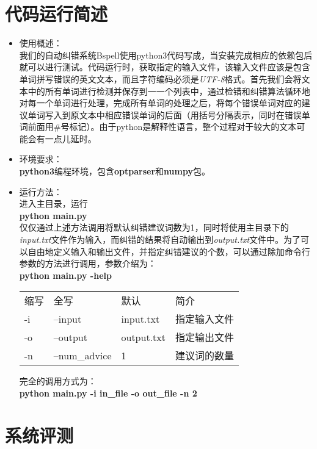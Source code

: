 \documentclass[UTF8,a4paper]{ctexart}
\begin{document}
\section{代码运行简述}

\begin{itemize}
    \item 使用概述： \\
    我们的自动纠错系统Bspell使用python3代码写成，当安装完成相应的依赖包后就可以进行测试。代码运行时，获取指定的输入文件，该输入文件应该是包含单词拼写错误的英文文本，而且字符编码必须是\textit{UTF-8}格式。首先我们会将文本中的所有单词进行检测并保存到一一个列表中，通过检错和纠错算法循环地对每一个单词进行处理，完成所有单词的处理之后，将每个错误单词对应的建议单词写入到原文本中相应错误单词的后面（用括号分隔表示，同时在错误单词前面用\#号标记）。由于python是解释性语言，整个过程对于较大的文本可能会有一点儿延时。
  \item 环境要求： \\
  \textbf{python3}编程环境，包含\textbf{optparser}和\textbf{numpy}包。
  \item 运行方法： \\
  进入主目录，运行 \\
  \quad \textbf{python main.py} \\
  仅仅通过上述方法调用将默认纠错建议词数为1，同时将使用主目录下的\textit{input.txt}文件作为输入，而纠错的结果将自动输出到\textit{output.txt}文件中。为了可以自由地定义输入和输出文件，并指定纠错建议的个数，可以通过除加命令行参数的方法进行调用，参数介绍为： \\
  \quad \textbf{python main.py -help}

  \begin{tabular}{|l|l|l|l|}
    \hline
    缩写 & 全写 & 默认 & 简介 \\
    -i & --input & input.txt & 指定输入文件 \\
    -o & --output & output.txt & 指定输出文件 \\
    -n & --num\_advice & 1 & 建议词的数量  \\
    \hline
  \end{tabular}

  完全的调用方式为： \\
  \quad \textbf{python main.py -i in\_file -o out\_file -n 2}
\end{itemize}

\section{系统评测}
\end{document}
